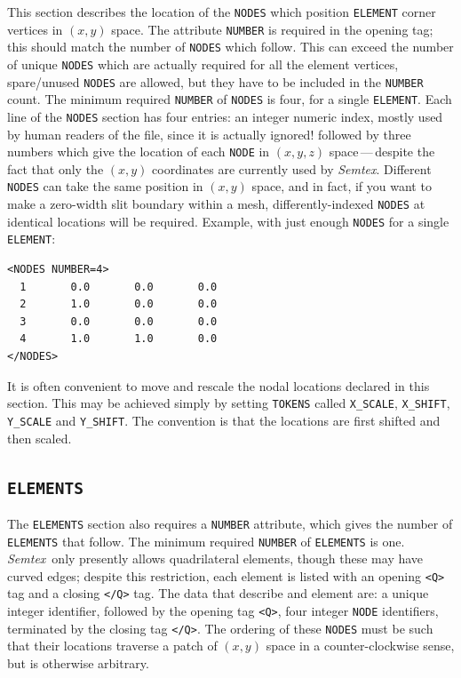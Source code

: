 \documentclass[11pt]{report}
\newcommand{\Semtex}{\emph{Semtex}} \newcommand{\Dog}{\emph{Dog}}
\begin{document}
This section describes the location of the \verb|NODES| which position
\verb|ELEMENT| corner vertices in $(x,y)$ space.  The attribute
\verb|NUMBER| is required in the opening tag; this should match the
number of \verb|NODES| which follow.  This can exceed the number of
unique \verb|NODES| which are actually required for all the element
vertices, \ie spare/unused \verb|NODES| are allowed, but they have to
be included in the \verb|NUMBER| count. The minimum required
\verb|NUMBER| of \verb|NODES| is four, \ie for a single
\verb|ELEMENT|.  Each line of the \verb|NODES| section has four
entries: an integer numeric index, mostly used by human readers of the
file, since it is actually ignored!  followed by three numbers which
give the location of each \verb|NODE| in $(x,y,z)$ space\,---\,despite
the fact that only the $(x,y)$ coordinates are currently used by
\Semtex.  Different \verb|NODES| can take the same position in $(x,y)$
space, and in fact, if you want to make a zero-width slit boundary
within a mesh, differently-indexed \verb|NODES| at identical locations
will be required.  Example, with just enough \verb|NODES| for a single
\verb|ELEMENT|:
%
{\small
\begin{verbatim}
<NODES NUMBER=4>
  1       0.0       0.0       0.0
  2       1.0       0.0       0.0
  3       0.0       0.0       0.0
  4       1.0       1.0       0.0
</NODES>
\end{verbatim}
}
%
It is often convenient to move and rescale the nodal locations
declared in this section. This may be achieved simply by setting
\verb|TOKENS| called \verb|X_SCALE|, \verb|X_SHIFT|, \verb|Y_SCALE|
and \verb|Y_SHIFT|.  The convention is that the locations are first
shifted and then scaled.

\subsection{\texttt{ELEMENTS}}
\label{sec.elements}

The \verb|ELEMENTS| section also requires a \verb|NUMBER| attribute,
which gives the number of \verb|ELEMENTS| that follow.  The minimum
required \verb|NUMBER| of \verb|ELEMENTS| is one.  \Semtex\ only
presently allows quadrilateral elements, though these may have curved
edges; despite this restriction, each element is listed with an
opening \verb|<Q>| tag and a closing \verb|</Q>| tag.  The data that
describe and element are: a unique integer identifier, followed by the
opening tag \verb|<Q>|, four integer \verb|NODE| identifiers,
terminated by the closing tag \verb|</Q>|.  The ordering of these
\verb|NODES| must be such that their locations traverse a patch of
$(x,y)$ space in a counter-clockwise sense, but is otherwise
arbitrary.
\end{document}
